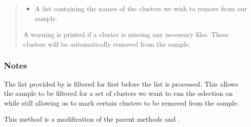 \documentclass[letterpaper,12pt,english]{sphinxmanual}
\begin{document}
\begin{fulllineitems}
\begin{fulllineitems}
\begin{quote}
\begin{description}
\begin{itemize}
\item {} 
\sphinxAtStartPar
{} \textendash{} A list containing the names of the clusters we wish to remove from our sample.

\end{itemize}

\sphinxAtStartPar
{} \textendash{} A warning is printed if a cluster is missing any necessary files. These clusters will be automatically
    removed from the sample.

\end{description}\end{quote}
\subsubsection*{Notes}

\sphinxAtStartPar
The list provided by  is filtered for first before the  list is processed. This allows the
sample to be filtered for a set of clusters we want to run the selection on while still allowing us to mark
certain clusters to be removed from the sample.

\end{fulllineitems}


\begin{fulllineitems}
\label{\detokenize{api/selector:SPTclIRAGN.Pipeline_functions.SelectFullFieldSDWFS.good_pixel_mask}}
\pysigstartsignatures
{}
\pysigstopsignatures
\sphinxAtStartPar
This method is a modification of the parent methods  and .


\end{fulllineitems}
\end{fulllineitems}
\end{document}
